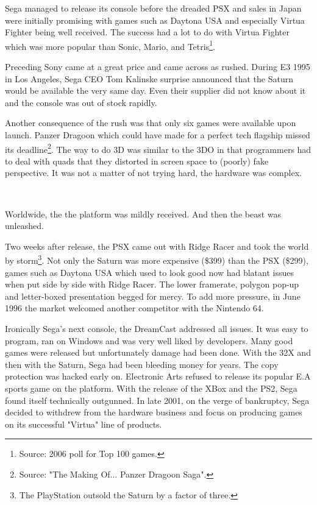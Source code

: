 \par
Sega managed to release its console before the dreaded PSX and sales in Japan were initially promising with games such as Daytona USA and especially Virtua Fighter being well received. The success had a lot to do with Virtua Fighter which was more popular than Sonic, Mario, and Tetris\footnote{Source: 2006 poll for Top 100 games.}.\\
\par
Preceding Sony came at a great price and came across as rushed. During E3 1995 in Los Angeles, Sega CEO Tom Kalinske surprise announced that the Saturn would be available the very same day. Even their supplier did not know about it and the console was out of stock rapidly.\\  
\par
Another consequence of the rush was that only six games were available upon launch. Panzer Dragoon which could have made for a perfect tech flagship missed its deadline\footnote{Source: "The Making Of... Panzer Dragoon Saga".}. The way to do 3D was similar to the 3DO in that programmers had to deal with quads that they distorted in screen space to (poorly) fake perspective. It was not a matter of not trying hard, the hardware was complex.\\
\par
{}\\
\par
Worldwide, the the platform was mildly received. And then the beast was unleashed.\\
\par
 Two weeks after release, the PSX came out with Ridge Racer and took the world by storm\footnote{The PlayStation outsold the Saturn by a factor of three.}. Not only the Saturn was more expensive (\$399) than the PSX (\$299), games such as Daytona USA which used to look good now had blatant issues when put side by side with Ridge Racer. The lower framerate, polygon pop-up and letter-boxed presentation begged for mercy. To add more pressure, in June 1996 the market welcomed another competitor with the Nintendo 64.\\
\par
Ironically Sega's next console, the DreamCast addressed all issues. It was easy to program, ran on Windows and was very well liked by developers. Many good games were released but unfortunately damage had been done. With the 32X and then with the Saturn, Sega had been bleeding money for years. The copy protection was hacked early on. Electronic Arts refused to release its popular E.A sports game on the platform. With the release of the XBox and the PS2, Sega found itself technically outgunned. In late 2001, on the verge of bankruptcy, Sega decided to withdrew from the hardware business and focus on producing games on its successful "Virtua" line of products.








